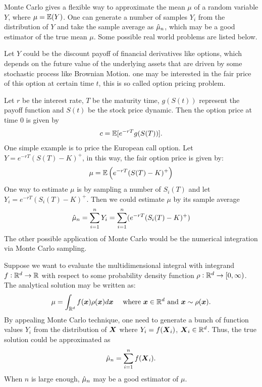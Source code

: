 \documentclass{iitthesis}
\begin{document}
Monte Carlo gives a flexible way to approximate the mean $\mu$ of a random variable $Y$, where $\mu=\mathbb{E}(Y)$. One can generate a number of samples $Y_i$ from the distribution of $Y$ and take the sample average as $\hat{\mu}_n$, which may be a good estimator of the true mean $\mu$. Some possible real world problems are listed below. 

Let $Y$ could be the discount payoff of financial derivatives like options, which depends on the future value of the underlying assets that are driven by some stochastic process like Brownian Motion. one may be interested in the fair price of this option at certain time $t$, this is so called option pricing problem. 

Let $r$ be the interest rate, $T$ be the maturity time, $g(S(t))$ represent the payoff function and $S(t)$  be the stock price dynamic. Then the option price at time 0 is given by $$c=\mathbb{E}[e^{-rT}g(S(T))].$$One simple example is to price the European call option. Let $Y = e^{-rT}(S(T)-K)^+ $, in this way, the fair option price is given by:
$$\mu = \mathbb{E}\left(e^{-rT}(S(T)-K)^+\right)$$
One way to estimate $\mu$ is by sampling a number of $S_i(T)$ and let $Y_i = e^{-rT}(S_i(T)-K)^+$. Then we could estimate $\mu$ by its sample average
$$\hat{\mu}_n = \sum_{i=1}^n Y_i = \sum_{i=1}^n( e^{-rT}(S_i(T)-K)^+)$$
The other possible application of Monte Carlo would be the numerical integration via Monte Carlo sampling.

Suppose we want to evaluate the multidimensional integral with integrand $f:\mathbb{R}^d \to \mathbb{R}$ with respect to some probability density function  $\rho: \mathbb{R}^d \to [0,\infty)$.
The analytical solution may be written as:
$$\mu = \int_{\mathbb{R}^d}f(\boldsymbol{x})\rho(\boldsymbol{x})d\boldsymbol{x} \quad \text{   where } \boldsymbol{x} \in \mathbb{R}^d \text{ and } \boldsymbol{x} \sim \rho(\boldsymbol{x}).$$
By appealing Monte Carlo technique, one need to generate a bunch of function values $Y_i$ from the distribution of $\boldsymbol{X}$ where $Y_i = f(\boldsymbol{X}_i)$, $\boldsymbol{X}_i \in \mathbb{R}^d$. Thus, the true solution could be approximated as
$$\hat{\mu}_n = \sum_{i=1}^n f(\boldsymbol{X}_i).$$
When $n$ is large enough, $\hat{\mu}_n$ may be a good estimator of $\mu$.
\end{document}
